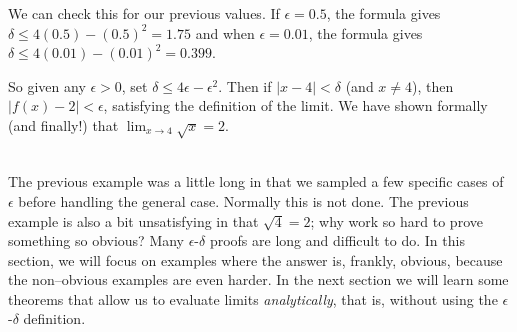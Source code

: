 {We can check this for our previous values.  If $\epsilon=0.5$, the formula gives
$\delta \leq 4(0.5) - (0.5)^2 = 1.75$ and when $\epsilon=0.01$, the formula gives $\delta \leq 4(0.01) - (0.01)^2 = 0.399$.

So given any $\epsilon >0$, set $\delta \leq 4\epsilon - \epsilon^2$. Then if $|x-4|<\delta$ (and $x\neq 4$), then $|f(x) - 2| < \epsilon$,  satisfying the definition of the limit.  We have shown formally (and finally!) that $\displaystyle \lim_{x\rightarrow 4} \sqrt{x} = 2 $.
}\\

The previous example was a little long in that we sampled a few specific cases of $\epsilon$ before handling the general case. Normally this is not done.  The previous example is also a bit unsatisfying in that $\sqrt{4}=2$; why work so hard to prove something so obvious? Many $\epsilon$-$\delta$ proofs are long and difficult to do. In this section, we will focus on examples where the answer is, frankly, obvious, because the non--obvious examples are even harder. In the next section we will learn some theorems that allow us to evaluate limits \textit{analytically}, that is, without using the $\epsilon$-$\delta$ definition.\\

